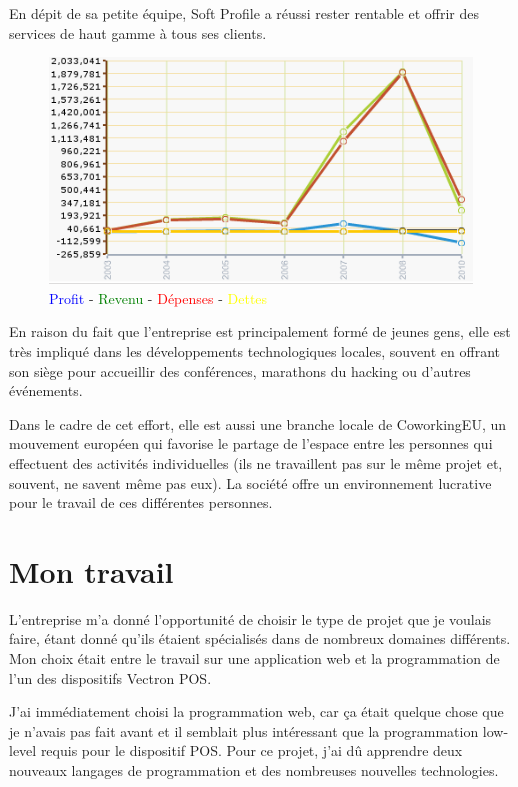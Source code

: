 \documentclass[a4paper,10pt]{report}
\begin{document}
En dépit de sa petite équipe, Soft Profile a réussi rester rentable et offrir des
services de haut gamme à tous ses clients.

\begin{figure}[h!]
	\centering
	\caption{\textcolor{blue}{Profit} - \textcolor{green}{Revenu} - \textcolor{red}{Dépenses} - \textcolor{yellow}{Dettes}}
	\includegraphics[scale=0.85]{img/soft-profit.png}
\end{figure}

En raison du fait que l'entreprise est principalement formé de jeunes gens, elle est très impliqué
dans les développements technologiques locales, souvent en offrant son siège pour accueillir des conférences,
marathons du hacking ou d'autres événements.

Dans le cadre de cet effort, elle est aussi une branche locale de CoworkingEU, un mouvement européen
qui favorise le partage de l'espace entre les personnes qui effectuent des activités individuelles
(ils ne travaillent pas sur le même projet et, souvent, ne savent même pas eux). La société
offre un environnement lucrative pour le travail de ces différentes personnes.

\section{Mon travail}

L'entreprise m'a donné l'opportunité de choisir le type de projet que je voulais faire,
étant donné qu'ils étaient spécialisés dans de nombreux domaines différents. Mon choix
était entre le travail sur une application web et la programmation de l'un des dispositifs
Vectron POS.

J'ai immédiatement choisi la programmation web, car ça était quelque chose que je
n'avais pas fait avant et il semblait plus intéressant que la programmation low-level
requis pour le dispositif POS. Pour ce projet, j'ai dû apprendre deux nouveaux langages
 de programmation et des nombreuses nouvelles technologies.
\end{document}
